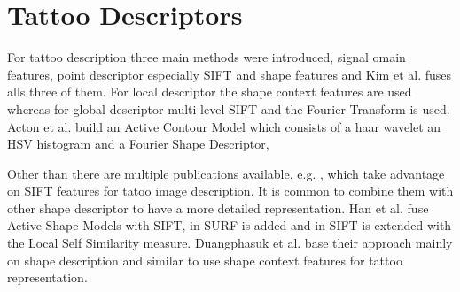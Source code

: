 \documentclass[draft,final]{vutinfth} %
\begin{document}
\section*{Tattoo Descriptors}
\par
For tattoo description three main methods were introduced, signal omain features, point descriptor especially SIFT and shape features and Kim et al. \cite{kim2015robust} fuses alls three of them.
For local descriptor the shape context features are used whereas for global descriptor multi-level SIFT and the Fourier Transform is used.
Acton et al. \cite{acton2008matching} build an Active Contour Model which consists of a haar wavelet an HSV histogram and a Fourier Shape Descriptor,
\par
Other than  \cite{kim2015robust} there are multiple publications available, e.g. \cite{duangphasuk2013tattoo}, which take advantage on SIFT features for tatoo image description.
It is common to combine them with other shape descriptor to have a more detailed representation.
Han et al. \cite{han2013tattoo} fuse Active Shape Models with SIFT,  in \cite{yi2015impact} SURF is added and in \cite{kim2016tattoo} SIFT is extended with the Local Self Similarity measure.
Duangphasuk et al. \cite{duangphasuk2013tattoo} base their approach mainly on shape description and similar to  \cite{kim2015robust} use shape context features for tattoo representation.
\end{document}
